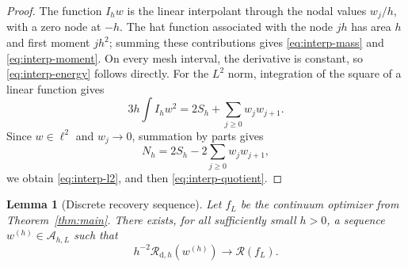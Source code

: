 \documentclass[11pt]{article}
\newtheorem{lemma}[theorem]{Lemma}
\theoremstyle{definition}
\theoremstyle{remark}
\newcommand{\Rcal}{\mathcal R}
\begin{document}
\begin{proof}
The function $I_hw$ is the linear interpolant through the nodal values
$w_j/h$, with a zero node at $-h$. The hat function associated with the node
$jh$ has area $h$ and first moment $jh^2$; summing these contributions gives
\eqref{eq:interp-mass} and \eqref{eq:interp-moment}. On every mesh interval,
the derivative is constant, so \eqref{eq:interp-energy} follows directly.
For the $L^2$ norm, integration of the square of a linear function gives
\[
 3h\int I_hw^2
 =2S_h+\sum_{j\geq0}w_jw_{j+1}.
\]
Since $w\in\ell^2$ and $w_j\to0$, summation by parts gives
\[
 N_h=2S_h-2\sum_{j\geq0}w_jw_{j+1},
\]
we obtain \eqref{eq:interp-l2}, and then \eqref{eq:interp-quotient}.
\end{proof}

\begin{lemma}[Discrete recovery sequence]\label{lem:discrete-recovery}
Let $f_L$ be the continuum optimizer from Theorem~\ref{thm:main}. There exists,
for all sufficiently small $h>0$, a sequence $w^{(h)}\in\mathcal A_{h,L}$ such that
\[
 h^{-2}\Rcal_{\mathrm d,h}(w^{(h)})\longrightarrow\Rcal(f_L).
\]
\end{lemma}
\end{document}
